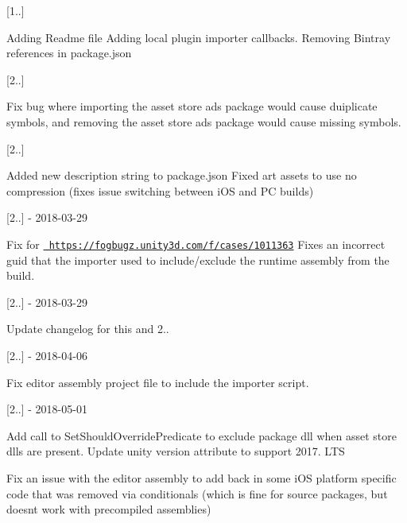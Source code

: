 \mbox{[}1..\mbox{]}

Adding Readme file Adding local plugin importer callbacks. Removing Bintray references in package.\+json

\mbox{[}2..\mbox{]}

Fix bug where importing the asset store ads package would cause duiplicate symbols, and removing the asset store ads package would cause missing symbols.

\mbox{[}2..\mbox{]}

Added new description string to package.\+json Fixed art assets to use no compression (fixes issue switching between i\+OS and PC builds)

\mbox{[}2..\mbox{]} -\/ 2018-\/03-\/29

Fix for \href{https://fogbugz.unity3d.com/f/cases/1011363}{\texttt{ https\+://fogbugz.\+unity3d.\+com/f/cases/1011363}} Fixes an incorrect guid that the importer used to include/exclude the runtime assembly from the build.

\mbox{[}2..\mbox{]} -\/ 2018-\/03-\/29

Update changelog for this and 2..

\mbox{[}2..\mbox{]} -\/ 2018-\/04-\/06

Fix editor assembly project file to include the importer script.

\mbox{[}2..\mbox{]} -\/ 2018-\/05-\/01

Add call to Set\+Should\+Override\+Predicate to exclude package dll when asset store dlls are present. Update unity version attribute to support 2017. L\+TS

Fix an issue with the editor assembly to add back in some i\+OS platform specific code that was removed via conditionals (which is fine for source packages, but doesn\textquotesingle{}t work with precompiled assemblies) 